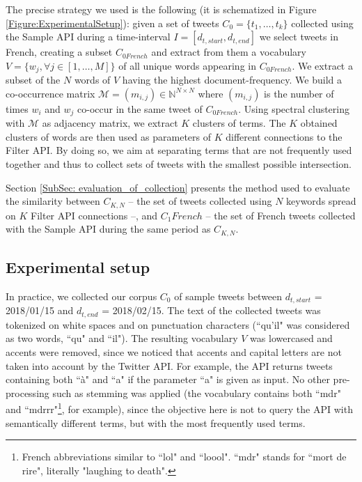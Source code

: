 The precise strategy we used is the following (it is schematized in Figure \ref{Figure:ExperimentalSetup}): given a set of tweets $C_{0}=\{t_{1},\ldots, t_{k}\}$  collected using the Sample API during a time-interval $I = [d_{t,start}, d_{t,end}]$ we select tweets in French, creating a subset $C_{0 French}$ and extract from them a vocabulary $V = \{w_j, \forall j\in[1, \ldots,M]\}$ of all unique words appearing in $C_{0 French}$. We extract a subset of the $N$ words of $V$ having the highest document-frequency. We build a co-occurrence matrix $\mathcal{M} = (m_{i,j}) \in \mathbb{N}^{N\times N}$ where $(m_{i,j})$ is the number of times $w_i$ and $w_j$ co-occur in the same tweet of $C_{0 French}$. Using spectral clustering with $\mathcal{M}$ as adjacency matrix, we extract  $K$ clusters of terms. The $K$ obtained clusters of words are then used as parameters of $K$ different connections to the Filter API. By doing so, we aim at separating terms that are not frequently used together and thus to collect sets of tweets with the smallest possible intersection.


Section \ref{SubSec: evaluation_of_collection} presents the method used to evaluate the similarity between $C_{K,N}$ -- the set of tweets collected using $N$ keywords spread on $K$ Filter API connections --, and $C_1 French$ -- the set of French tweets collected with the Sample API during the same period as $C_{K,N}$.

			\subsection{Experimental setup}

In practice, we collected our corpus $C_0$ of sample tweets between $d_{t,start} $ = 2018/01/15 and $d_{t,end}$ = 2018/02/15. The text of the collected tweets was tokenized on white spaces and on punctuation characters (``qu'il" was considered as two words, ``qu" and ``il"). The resulting vocabulary $V$ was lowercased and accents were removed, since we noticed that accents and capital letters are not taken into account by the Twitter API. For example, the API returns tweets containing both ``à" and ``a" if the parameter ``a" is given as input. No other pre-processing such as stemming was applied (the vocabulary contains both ``mdr" and ``mdrrr"\footnote{French abbreviations similar to ``lol" and ``loool". ``mdr" stands for ``mort de rire", literally "laughing to death".}, for example), since the objective here is not to query the API with semantically different terms, but with the most frequently used terms.


